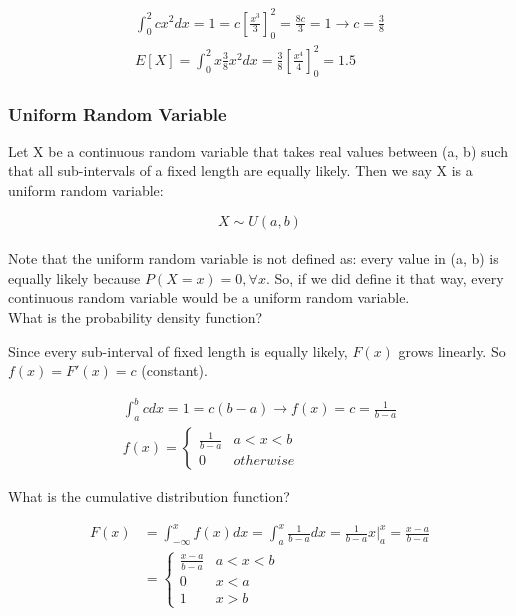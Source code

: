 \documentclass[12pt, letterpaper]{article}
\begin{document}
\begin{align*}
\int_{0}^{2} cx^2 dx = 1 = c \left[\frac{x^3}{3}\right]_{0}^{2} = \frac{8c}{3} = 1 \rightarrow c = \frac{3}{8}\\
E[X] = \int_{0}^{2} x \frac{3}{8} x^2 dx = \frac{3}{8} \left[\frac{x^4}{4}\right]_{0}^{2} = 1.5
\end{align*}

\subsubsection{Uniform Random Variable}
Let X be a continuous random variable that takes real values between (a, b) such that all sub-intervals of a fixed length are equally likely. Then we say X is a uniform random variable:

\begin{equation}
X \sim U(a, b)
\end{equation}\\

Note that the uniform random variable is not defined as: every value in (a, b) is equally likely because \(P\left(X = x\right) = 0, \forall x\). So, if we did define it that way, every continuous random variable would be a uniform random variable.\\

What is the probability density function?

Since every sub-interval of fixed length is equally likely, \(F\left(x\right)\) grows linearly. So \(f\left(x\right) = F'\left(x\right) = c\) (constant).

\begin{align*}
\int_{a}^{b} c dx = 1 = c (b - a) \rightarrow f\left(x\right) = c = \frac{1}{b - a}\\
f\left(x\right) = 
	\begin{cases}
	\frac{1}{b - a} & a < x < b\\
	0 & otherwise
	\end{cases}
\end{align*}

What is the cumulative distribution function?

\begin{align*}
F\left(x\right) &= \int_{-\infty}^{x} f\left(x\right) dx = \int_{a}^{x} \frac{1}{b - a} dx = \frac{1}{b - a} x \vert_{a}^{x} = \frac{x - a}{b - a}\\
&= 
	\begin{cases}
	\frac{x - a}{b - a} & a < x < b\\
	0 & x < a\\
	1 & x > b
	\end{cases}
\end{align*}
\end{document}
